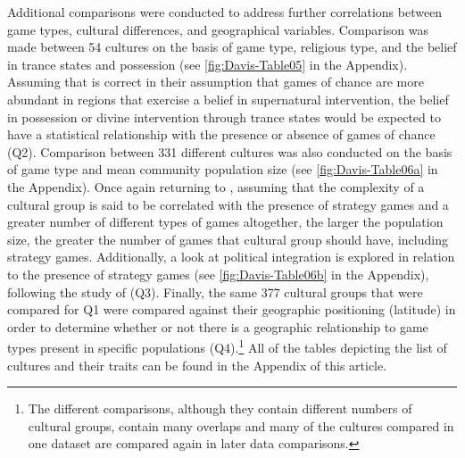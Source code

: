 \documentclass[%
	]{ijsra}
\begin{document}
Additional comparisons were conducted to address further correlations between game types, cultural differences, and geographical variables. Comparison was made between 54 cultures on the basis of game type, religious type, and the belief in trance states and possession (see \cref{fig:Davis-Table05} in the Appendix). Assuming that \textcite{roberts1959} is correct in their assumption that games of chance are more abundant in regions that exercise a belief in supernatural intervention, the belief in possession or divine intervention through trance states would be expected to have a statistical relationship with the presence or absence of games of chance (Q2). Comparison between 331 different cultures was also conducted on the basis of game type and mean community population size (see \cref{fig:Davis-Table06a} in the Appendix). Once again returning to \textcite{roberts1959}, assuming that the complexity of a cultural group is said to be correlated with the presence of strategy games and a greater number of different types of games altogether, the larger the population size, the greater the number of games that cultural group should have, including strategy games. Additionally, a look at political integration is explored in relation to the presence of strategy games (see \cref{fig:Davis-Table06b} in the Appendix), following the study of \textcite{roberts1959} (Q3). Finally, the same 377 cultural groups that were compared for Q1 were compared against their geographic positioning (latitude) in order to determine whether or not there is a geographic relationship to game types present in specific populations (Q4).\footnote{The different comparisons, although they contain different numbers of cultural groups, contain many overlaps and many of the cultures compared in one dataset are compared again in later data comparisons.} All of the tables depicting the list of cultures and their traits can be found in the Appendix of this article.


\end{document}
